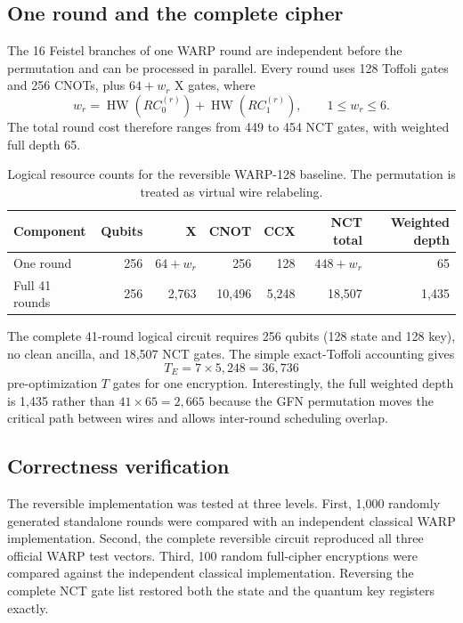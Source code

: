 \documentclass[10pt,a4paper]{article}
\newcommand{\HW}{\operatorname{HW}}
\begin{document}
\subsection{One round and the complete cipher}
The 16 Feistel branches of one WARP round are independent before the permutation and can be processed in parallel. Every round uses 128 Toffoli gates and 256 CNOTs, plus $64+w_r$ X gates, where
\begin{equation}
    w_r = \HW(RC_0^{(r)})+\HW(RC_1^{(r)}), \qquad 1\le w_r\le 6.
\end{equation}
The total round cost therefore ranges from 449 to 454 NCT gates, with weighted full depth 65.

\begin{table}[t]
\centering
\caption{Logical resource counts for the reversible WARP-128 baseline. The permutation is treated as virtual wire relabeling.}
\label{tab:warp_resources}
\begin{tabular}{lrrrrrr}
\toprule
Component & Qubits & X & CNOT & CCX & NCT total & Weighted depth\\
\midrule
One round & 256 & $64+w_r$ & 256 & 128 & $448+w_r$ & 65\\
Full 41 rounds & 256 & 2,763 & 10,496 & 5,248 & 18,507 & 1,435\\
\bottomrule
\end{tabular}
\end{table}

The complete 41-round logical circuit requires 256 qubits (128 state and 128 key), no clean ancilla, and 18,507 NCT gates. The simple exact-Toffoli accounting gives
\begin{equation}
    T_E = 7\times 5{,}248 = 36{,}736
\end{equation}
pre-optimization $T$ gates for one encryption. Interestingly, the full weighted depth is 1,435 rather than $41\times65=2,665$ because the GFN permutation moves the critical path between wires and allows inter-round scheduling overlap.

\subsection{Correctness verification}
The reversible implementation was tested at three levels. First, 1,000 randomly generated standalone rounds were compared with an independent classical WARP implementation. Second, the complete reversible circuit reproduced all three official WARP test vectors. Third, 100 random full-cipher encryptions were compared against the independent classical implementation. Reversing the complete NCT gate list restored both the state and the quantum key registers exactly.
\end{document}
